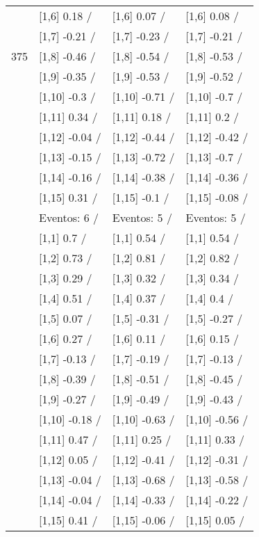 \begin{table}
\begin{tabular}[t]{llll}
 & {}[1,6] 0.18  / & {}[1,6] 0.07  / & {}[1,6] 0.08  /\\
 & {}[1,7] -0.21  / & {}[1,7] -0.23  / & {}[1,7] -0.21  /\\
375 & {}[1,8] -0.46  / & {}[1,8] -0.54  / & {}[1,8] -0.53  /\\
\addlinespace
 & {}[1,9] -0.35  / & {}[1,9] -0.53  / & {}[1,9] -0.52  /\\
 & {}[1,10] -0.3  / & {}[1,10] -0.71  / & {}[1,10] -0.7  /\\
 & {}[1,11] 0.34  / & {}[1,11] 0.18  / & {}[1,11] 0.2  /\\
 & {}[1,12] -0.04  / & {}[1,12] -0.44  / & {}[1,12] -0.42  /\\
 & {}[1,13] -0.15  / & {}[1,13] -0.72  / & {}[1,13] -0.7  /\\
\addlinespace
 & {}[1,14] -0.16  / & {}[1,14] -0.38  / & {}[1,14] -0.36  /\\
 & {}[1,15] 0.31  / & {}[1,15] -0.1  / & {}[1,15] -0.08  /\\
 & Eventos:  6 / & Eventos:  5 / & Eventos:  5 /\\
 & {}[1,1] 0.7  / & {}[1,1] 0.54  / & {}[1,1] 0.54  /\\
 & {}[1,2] 0.73  / & {}[1,2] 0.81  / & {}[1,2] 0.82  /\\
\addlinespace
 & {}[1,3] 0.29  / & {}[1,3] 0.32  / & {}[1,3] 0.34  /\\
 & {}[1,4] 0.51  / & {}[1,4] 0.37  / & {}[1,4] 0.4  /\\
 & {}[1,5] 0.07  / & {}[1,5] -0.31  / & {}[1,5] -0.27  /\\
 & {}[1,6] 0.27  / & {}[1,6] 0.11  / & {}[1,6] 0.15  /\\
 & {}[1,7] -0.13  / & {}[1,7] -0.19  / & {}[1,7] -0.13  /\\
\addlinespace
500 & {}[1,8] -0.39  / & {}[1,8] -0.51  / & {}[1,8] -0.45  /\\
 & {}[1,9] -0.27  / & {}[1,9] -0.49  / & {}[1,9] -0.43  /\\
 & {}[1,10] -0.18  / & {}[1,10] -0.63  / & {}[1,10] -0.56  /\\
 & {}[1,11] 0.47  / & {}[1,11] 0.25  / & {}[1,11] 0.33  /\\
 & {}[1,12] 0.05  / & {}[1,12] -0.41  / & {}[1,12] -0.31  /\\
\addlinespace
 & {}[1,13] -0.04  / & {}[1,13] -0.68  / & {}[1,13] -0.58  /\\
 & {}[1,14] -0.04  / & {}[1,14] -0.33  / & {}[1,14] -0.22  /\\
 & {}[1,15] 0.41  / & {}[1,15] -0.06  / & {}[1,15] 0.05  /\\
\bottomrule
\end{tabular}
\end{table}
